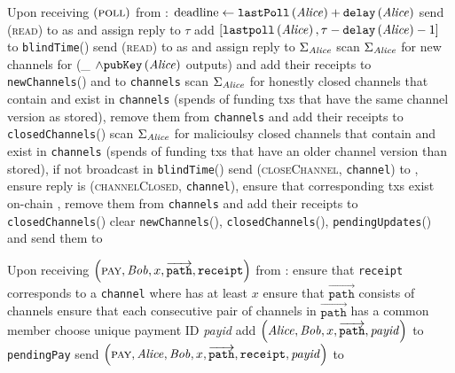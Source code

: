 \begin{functionality}{\fpaynet}
\begin{algorithmic}[1]
    \State Upon receiving $\left(\textsc{poll}\right)$ from \alice:
    \Indent
      \State $\mathrm{deadline} \gets \mathtt{lastPoll}\left(\mathit{Alice}\right) +
      \mathtt{delay}\left(\mathit{Alice}\right)$
      \State send (\textsc{read}) to \clock{} as \alice and assign reply to
      $\tau$
        \State add $\left[\mathtt{lastpoll}\left(\mathit{Alice}\right), \tau -
        \texttt{delay}\left(\mathit{Alice}\right) - 1\right]$ to
        \texttt{blindTime}(\alice)
      \EndIf
      \State send (\textsc{read}) to \ledger{} as \alice{} and assign reply to
      $\Sigma_{\mathit{Alice}}$
      \State scan $\Sigma_{\mathit{Alice}}$ for new channels for \alice{} (\_ $\wedge
      \mathtt{pubKey}\left(\mathit{Alice}\right)$ outputs) and add their receipts to
      \texttt{newChannels}(\alice) and to \texttt{channels}
      \State scan $\Sigma_{\mathit{Alice}}$ for honestly closed channels that contain
      \alice{} and exist in \texttt{channels} (spends of funding txs that have
      the same channel version as stored), remove them from \texttt{channels}
      and add their receipts to \texttt{closedChannels}(\alice)
      \State scan $\Sigma_{\mathit{Alice}}$ for malicioulsy closed channels that contain
      \alice{} and exist in \texttt{channels} (spends of funding txs that have
      an older channel version than stored), if not broadcast in
      \texttt{blindTime}(\alice) send (\textsc{closeChannel}, \texttt{channel})
      to \simulator, ensure reply is (\textsc{channelClosed}, \texttt{channel}),
      ensure that corresponding txs exist on-chain , remove them
      from \texttt{channels} and add their receipts to
      \texttt{closedChannels}(\alice)
      \State clear \texttt{newChannels}(\alice),
      \texttt{closedChannels}(\alice), \texttt{pendingUpdates}(\alice) and send
      them to \alice
    \EndIndent
    \State

    \State Upon receiving $\left(\textsc{pay}, \mathit{Bob}, x,
    \overrightarrow{\mathtt{path}}, \mathtt{receipt}\right)$ from \alice:
    \Indent
      \State ensure that \texttt{receipt} corresponds to a \texttt{channel}
      where \alice{} has at least $x$
      \State ensure that $\overrightarrow{\mathtt{path}}$ consists of channels
      \State ensure that each consecutive pair of channels in
      $\overrightarrow{\mathtt{path}}$ has a common member
      \State choose unique payment ID \textit{payid}
      \State add $\left(\mathit{Alice}, \mathit{Bob}, x, \overrightarrow{\mathtt{path}},
      \mathit{payid}\right)$ to \texttt{pendingPay}
      \State send $\left(\textsc{pay}, \mathit{Alice}, \mathit{Bob}, x,
      \overrightarrow{\mathtt{path}}, \mathtt{receipt}, \mathit{payid}\right)$
      to \simulator
    \EndIndent
    \State


\end{algorithmic}
\end{functionality}
